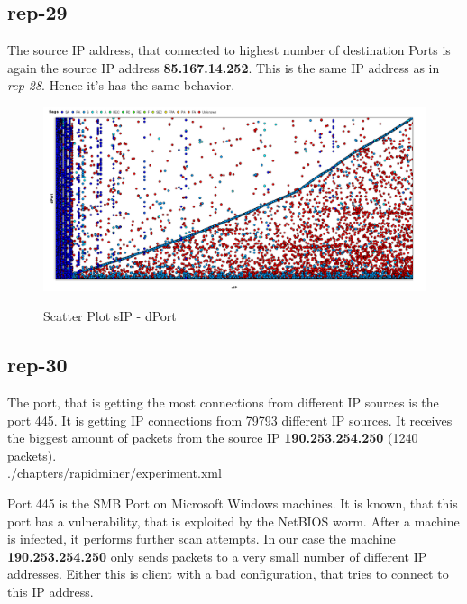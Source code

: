 \subsection*{rep-29}
The source IP address, that connected to highest number of destination Ports is again the source IP address \textbf{85.167.14.252}. This is the same IP address as in \textit{rep-28}. Hence it's has the same behavior.

\begin{figure}[H]
\center
\includegraphics[width=.7\textwidth]{./chapters/plots/rep29.png}\\
\caption{Scatter Plot sIP - dPort}
\end{figure}

\subsection*{rep-30}
The port, that is getting the most connections from different IP sources is the port 445. It is getting IP connections from 79793 different IP sources. It receives the biggest amount of packets from the source IP \textbf{190.253.254.250} (1240 packets). \\


				{./chapters/rapidminer/experiment.xml}

Port 445 is the SMB Port on Microsoft Windows machines. It is known, that this port has a vulnerability, that is exploited by the NetBIOS worm. After a machine is infected, it performs further scan attempts. In our case the machine \textbf{190.253.254.250} only sends packets to a very small number of different IP addresses. Either this is client with a bad configuration, that tries to connect to this IP address.

